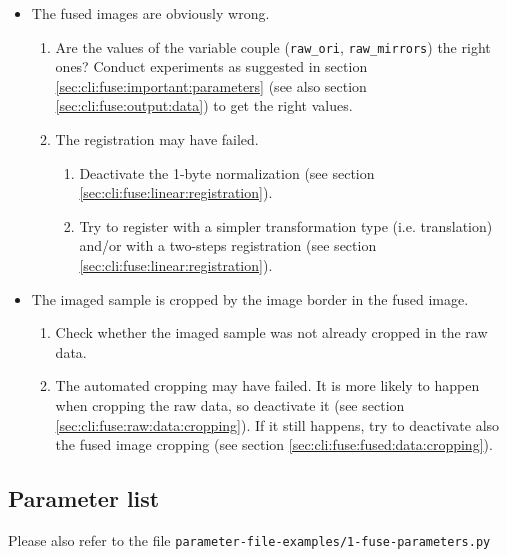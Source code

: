 \begin{itemize}
\item The fused images are obviously wrong.
  \begin{enumerate}
  \item Are the values of the variable couple (\texttt{raw\_ori}, \texttt{raw\_mirrors}) the right ones? Conduct experiments as suggested in section \ref{sec:cli:fuse:important:parameters}  (see also section \ref{sec:cli:fuse:output:data}) to get the right values.
  \item The registration may have failed.
    \begin{enumerate}
    \item Deactivate the 1-byte normalization (see section \ref{sec:cli:fuse:linear:registration}).
    \item Try to register with a simpler transformation type (i.e. translation) and/or with a two-steps registration (see section \ref{sec:cli:fuse:linear:registration}).
    \end{enumerate}
  \end{enumerate}
\item The imaged sample is cropped by the image border in the fused image.
  \begin{enumerate}
  \item Check whether the imaged sample was not already cropped in the raw data.
  \item The automated cropping may have failed. It is more likely to happen when cropping the raw data, so deactivate it (see section \ref{sec:cli:fuse:raw:data:cropping}). If it still happens, try to deactivate also the fused image cropping   (see section \ref{sec:cli:fuse:fused:data:cropping}).
  \end{enumerate}
\end{itemize}

\subsection{Parameter list}

Please also refer to the file
\texttt{parameter-file-examples/1-fuse-parameters.py}

